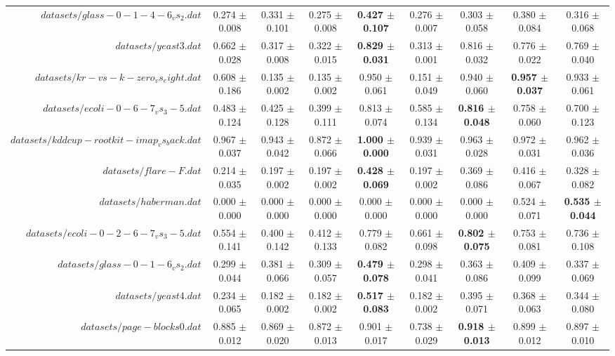 \begin{table}[!ht]
{\begin{tabular}{r c c c c c c c c}
$datasets/glass-0-1-4-6_vs_2.dat$ & 0.274 $\pm$ 0.008 & 0.331 $\pm$ 0.101 & 0.275 $\pm$ 0.008 & \textbf{0.427 $\pm$ 0.107} & 0.276 $\pm$ 0.007 & 0.303 $\pm$ 0.058 & 0.380 $\pm$ 0.084 & 0.316 $\pm$ 0.068 \\
$datasets/yeast3.dat$ & 0.662 $\pm$ 0.028 & 0.317 $\pm$ 0.008 & 0.322 $\pm$ 0.015 & \textbf{0.829 $\pm$ 0.031} & 0.313 $\pm$ 0.001 & 0.816 $\pm$ 0.032 & 0.776 $\pm$ 0.022 & 0.769 $\pm$ 0.040 \\
$datasets/kr-vs-k-zero_vs_eight.dat$ & 0.608 $\pm$ 0.186 & 0.135 $\pm$ 0.002 & 0.135 $\pm$ 0.002 & 0.950 $\pm$ 0.061 & 0.151 $\pm$ 0.049 & 0.940 $\pm$ 0.060 & \textbf{0.957 $\pm$ 0.037} & 0.933 $\pm$ 0.061 \\
$datasets/ecoli-0-6-7_vs_3-5.dat$ & 0.483 $\pm$ 0.124 & 0.425 $\pm$ 0.128 & 0.399 $\pm$ 0.111 & 0.813 $\pm$ 0.074 & 0.585 $\pm$ 0.134 & \textbf{0.816 $\pm$ 0.048} & 0.758 $\pm$ 0.060 & 0.700 $\pm$ 0.123 \\
$datasets/kddcup-rootkit-imap_vs_back.dat$ & 0.967 $\pm$ 0.037 & 0.943 $\pm$ 0.042 & 0.872 $\pm$ 0.066 & \textbf{1.000 $\pm$ 0.000} & 0.939 $\pm$ 0.031 & 0.963 $\pm$ 0.028 & 0.972 $\pm$ 0.031 & 0.962 $\pm$ 0.036 \\
$datasets/flare-F.dat$ & 0.214 $\pm$ 0.035 & 0.197 $\pm$ 0.002 & 0.197 $\pm$ 0.002 & \textbf{0.428 $\pm$ 0.069} & 0.197 $\pm$ 0.002 & 0.369 $\pm$ 0.086 & 0.416 $\pm$ 0.067 & 0.328 $\pm$ 0.082 \\
$datasets/haberman.dat$ & 0.000 $\pm$ 0.000 & 0.000 $\pm$ 0.000 & 0.000 $\pm$ 0.000 & 0.000 $\pm$ 0.000 & 0.000 $\pm$ 0.000 & 0.000 $\pm$ 0.000 & 0.524 $\pm$ 0.071 & \textbf{0.535 $\pm$ 0.044} \\
$datasets/ecoli-0-2-6-7_vs_3-5.dat$ & 0.554 $\pm$ 0.141 & 0.400 $\pm$ 0.142 & 0.412 $\pm$ 0.133 & 0.779 $\pm$ 0.082 & 0.661 $\pm$ 0.098 & \textbf{0.802 $\pm$ 0.075} & 0.753 $\pm$ 0.081 & 0.736 $\pm$ 0.108 \\
$datasets/glass-0-1-6_vs_2.dat$ & 0.299 $\pm$ 0.044 & 0.381 $\pm$ 0.066 & 0.309 $\pm$ 0.057 & \textbf{0.479 $\pm$ 0.078} & 0.298 $\pm$ 0.041 & 0.363 $\pm$ 0.086 & 0.409 $\pm$ 0.099 & 0.337 $\pm$ 0.069 \\
$datasets/yeast4.dat$ & 0.234 $\pm$ 0.065 & 0.182 $\pm$ 0.002 & 0.182 $\pm$ 0.002 & \textbf{0.517 $\pm$ 0.083} & 0.182 $\pm$ 0.002 & 0.395 $\pm$ 0.071 & 0.368 $\pm$ 0.063 & 0.344 $\pm$ 0.080 \\
$datasets/page-blocks0.dat$ & 0.885 $\pm$ 0.012 & 0.869 $\pm$ 0.020 & 0.872 $\pm$ 0.013 & 0.901 $\pm$ 0.017 & 0.738 $\pm$ 0.029 & \textbf{0.918 $\pm$ 0.013} & 0.899 $\pm$ 0.012 & 0.897 $\pm$ 0.010 \\

\end{tabular}}
\end{table}
